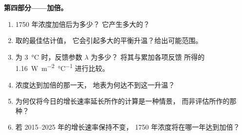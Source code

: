 \begin{problem}
\medskip
\noindent\textbf{第四部分——加倍。}
\begin{enumerate}[resume]
  \item 1750 年浓度加倍后为多少？
        它产生多大的？
  \item 取的最佳估计值，
        它会引起多大的平衡升温？给出可能范围。
  \item {}为 \qty{3}{\degreeCelsius} 时，反馈参数 $\lambda$ 为多少？
        将其与累加各项反馈
        所得的 \qty{1.16}{W.m^{-2}.\degreeCelsius^{-1}}
        进行比较。
  \item 浓度达到加倍的那一天，
        地表为何达不到这一升温？
  \item 为何仅将今日的增长速率延长所作的计算是一种情景，
        而非评估所作的那种？
  \item 若 2015--2025 年的增长速率保持不变，
        1750 年浓度将在哪一年达到加倍？
\end{enumerate}
\end{problem}
